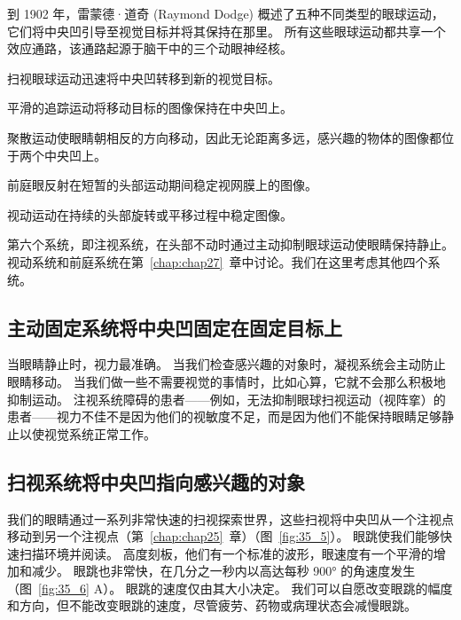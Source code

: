 到 1902 年，雷蒙德·道奇 (Raymond Dodge) 概述了五种不同类型的眼球运动，它们将中央凹引导至视觉目标并将其保持在那里。
所有这些眼球运动都共享一个效应通路，该通路起源于脑干中的三个动眼神经核。


扫视眼球运动迅速将中央凹转移到新的视觉目标。


平滑的追踪运动将移动目标的图像保持在中央凹上。


聚散运动使眼睛朝相反的方向移动，因此无论距离多远，感兴趣的物体的图像都位于两个中央凹上。


前庭眼反射在短暂的头部运动期间稳定视网膜上的图像。


视动运动在持续的头部旋转或平移过程中稳定图像。


第六个系统，即注视系统，在头部不动时通过主动抑制眼球运动使眼睛保持静止。
视动系统和前庭系统在第~\ref{chap:chap27}~章中讨论。我们在这里考虑其他四个系统。



\subsection{主动固定系统将中央凹固定在固定目标上}

当眼睛静止时，视力最准确。
当我们检查感兴趣的对象时，凝视系统会主动防止眼睛移动。
当我们做一些不需要视觉的事情时，比如心算，它就不会那么积极地抑制运动。
注视系统障碍的患者——例如，无法抑制眼球扫视运动（视阵挛）的患者——视力不佳不是因为他们的视敏度不足，而是因为他们不能保持眼睛足够静止以使视觉系统正常工作。



\subsection{扫视系统将中央凹指向感兴趣的对象}

我们的眼睛通过一系列非常快速的扫视探索世界，这些扫视将中央凹从一个注视点移动到另一个注视点（第~\ref{chap:chap25}~章）（图~\ref{fig:35_5}）。
眼跳使我们能够快速扫描环境并阅读。 
高度刻板，他们有一个标准的波形，眼速度有一个平滑的增加和减少。 
眼跳也非常快，在几分之一秒内以高达每秒 900° 的角速度发生（图~\ref{fig:35_6} A）。 
眼跳的速度仅由其大小决定。 我们可以自愿改变眼跳的幅度和方向，但不能改变眼跳的速度，尽管疲劳、药物或病理状态会减慢眼跳。


